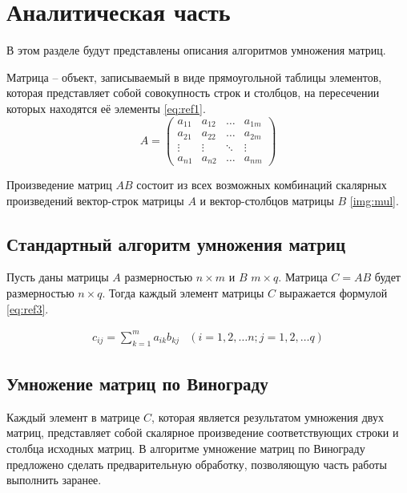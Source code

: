 \chapter{Аналитическая часть}

В этом разделе будут представлены описания алгоритмов умножения матриц.

Матрица -- объект, записываемый в виде прямоугольной таблицы элементов, которая представляет собой совокупность строк и столбцов, на пересечении которых находятся её элементы \ref{eq:ref1}.
\begin{equation}
	A = \left(
	\begin{array}{cccc}
			a_{11} & a_{12} & \ldots & a_{1m} \\
			a_{21} & a_{22} & \ldots & a_{2m} \\
			\vdots & \vdots & \ddots & \vdots \\
			a_{n1} & a_{n2} & \ldots & a_{nm}
		\end{array}
	\right)
	\label{eq:ref1}
\end{equation}

Произведение матриц $AB$ состоит из всех возможных комбинаций скалярных произведений вектор-строк матрицы $A$ и вектор-столбцов матрицы $B$ \ref{img:mul}.


\section{Стандартный алгоритм умножения матриц}

Пусть даны матрицы $A$ размерностью $n \times m$ и $B$ $m \times q$.
Матрица $C = AB$ будет размерностью $n \times q$.
Тогда каждый элемент матрицы $C$ выражается формулой \ref{eq:ref3}.

\begin{equation}
	\begin{array}{cc}
		c_{ij} = \sum\limits_{k=1}^m a_{ik}b_{kj} & (i=1,2,\dots n; j=1,2,\dots q)
	\end{array}
	\label{eq:ref3}
\end{equation}

\section{Умножение матриц по Винограду}

Каждый элемент в матрице $C$, которая является результатом умножения двух матриц, представляет собой скалярное произведение соответствующих строки и столбца исходных матриц. 
В алгоритме умножение матриц по Винограду предложено сделать предварительную обработку, позволяющую часть работы выполнить заранее.

